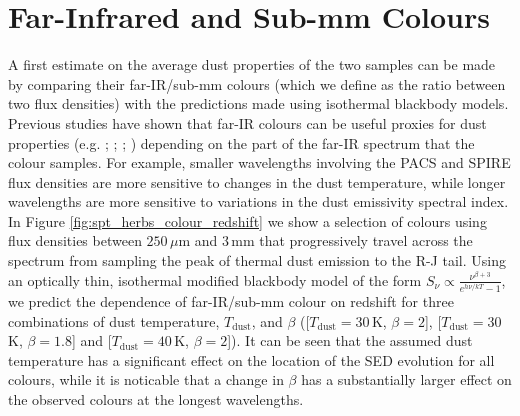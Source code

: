 \section{Far-Infrared and Sub-mm Colours}
\label{sec:fir_submm_colours}

A first estimate on the average dust properties of the two samples can be made by comparing their far-IR/sub-mm colours (which we define as the ratio between two flux densities) with the predictions made using isothermal blackbody models. Previous studies have shown that far-IR colours can be useful proxies for dust properties (e.g. \citealt{Boselli_2010}; \citealt{Boselli_2012}; \citealt{Remy-Ruyer_2013}; \citealt{Smith_2019}) depending on the part of the far-IR spectrum that the colour samples. For example, smaller wavelengths involving the PACS and SPIRE flux densities are more sensitive to changes in the dust temperature, while longer wavelengths are more sensitive to variations in the dust emissivity spectral index. In Figure \ref{fig:spt_herbs_colour_redshift} we show a selection of colours using flux densities between $250\,\mu$m and $3\,$mm that progressively travel across the spectrum from sampling the peak of thermal dust emission to the R-J tail. Using an optically thin, isothermal modified blackbody model of the form $S_\nu \propto \frac{\nu^{\beta+3}}{e^{h \nu/kT} - 1}$, we predict the dependence of far-IR/sub-mm colour on redshift for three combinations of dust temperature, $T_{\textrm{dust}}$, and $\beta$ ([$T_{\textrm{dust}} = 30\,$K, $\beta = 2$], [$T_{\textrm{dust}} = 30\,$K, $\beta = 1.8$] and [$T_{\textrm{dust}} = 40\,$K, $\beta = 2$]). It can be seen that the assumed dust temperature has a significant effect on the location of the SED evolution for all colours, while it is noticable that a change in $\beta$ has a substantially larger effect on the observed colours at the longest wavelengths. 

